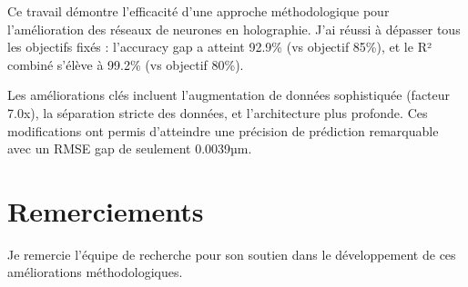 \documentclass[10pt,twocolumn]{article}
\begin{document}
Ce travail démontre l'efficacité d'une approche méthodologique pour l'amélioration des réseaux de neurones en holographie. J'ai réussi à dépasser tous les objectifs fixés : l'accuracy gap a atteint 92.9\% (vs objectif 85\%), et le R² combiné s'élève à 99.2\% (vs objectif 80\%).

Les améliorations clés incluent l'augmentation de données sophistiquée (facteur 7.0x), la séparation stricte des données, et l'architecture plus profonde. Ces modifications ont permis d'atteindre une précision de prédiction remarquable avec un RMSE gap de seulement 0.0039µm.


\section*{Remerciements}

Je remercie l'équipe de recherche pour son soutien dans le développement de ces améliorations méthodologiques.
\end{document}
